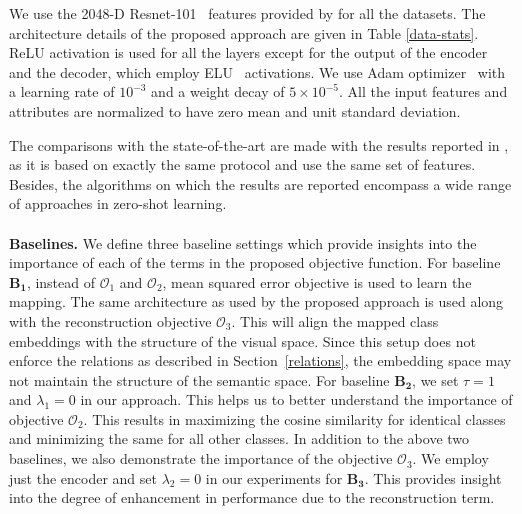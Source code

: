 \documentclass[10pt,twocolumn,letterpaper]{article}
\begin{document}
We use the 2048-D Resnet-101~\cite{he2016deep} features provided by \cite{Xian_2017_CVPR} for all the datasets. 
The architecture details of the proposed approach are given in Table \ref{data-stats}. %
ReLU activation is used for all the layers except for the output of the encoder and the decoder, which employ ELU~\cite{clevert2015fast} activations. We use Adam optimizer~\cite{kingma2014adam} with a learning rate of $10^{-3}$ and a weight decay of $5\times10^{-5}$. 
All the input features and attributes are normalized to have zero mean and unit standard deviation.

The comparisons with the state-of-the-art are made with the results reported in \cite{xian2017zero1}, as it is based on exactly the same protocol and use the same set of features. Besides, the algorithms on which the results are reported encompass a wide range of approaches in zero-shot learning. \\ \\
{\bf Baselines.} We define three baseline settings which provide insights into the importance of each of the terms in the proposed objective function. 
For baseline $\mathbf{B_1}$, instead of  $\mathcal{O}_1$ and $\mathcal{O}_2$, mean squared error objective is used to learn the mapping.
The same architecture as used by the proposed approach is used along with the reconstruction objective $\mathcal{O}_3$.  
This will align the mapped class embeddings with the structure of the visual space.
Since this setup does not enforce the relations as described in Section~\ref{relations}, the embedding space may not maintain the structure of the semantic space.
For baseline $\mathbf{B_2}$, we set $\tau = 1$ and $\lambda_1 = 0$ in our approach. This helps us to better understand the importance of objective $\mathcal{O}_2$.
This results in maximizing the cosine similarity for identical classes and minimizing the same for all other classes.
In addition to the above two baselines, we also demonstrate the importance of the objective $\mathcal{O}_3$. We employ just the encoder and set $\lambda_2=0$ in our experiments for $\mathbf{B_3}$. 
This provides insight into the degree of enhancement in performance due to the reconstruction term.
\end{document}
